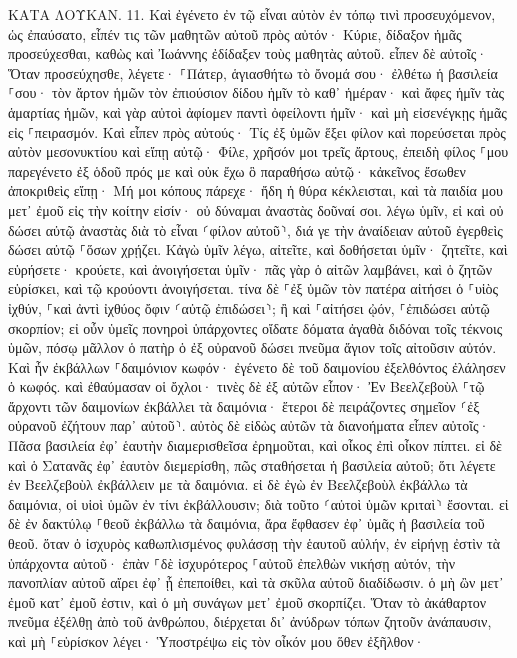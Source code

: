 \documentclass[twoside, 9pt]{extreport}
\begin{document}
ΚΑΤΑ ΛΟΥΚΑΝ.
11.
Καὶ ἐγένετο ἐν τῷ εἶναι αὐτὸν ἐν τόπῳ τινὶ προσευχόμενον, ὡς ἐπαύσατο, εἶπέν τις τῶν μαθητῶν αὐτοῦ πρὸς αὐτόν· Κύριε, δίδαξον ἡμᾶς προσεύχεσθαι, καθὼς καὶ Ἰωάννης ἐδίδαξεν τοὺς μαθητὰς αὐτοῦ. 
εἶπεν δὲ αὐτοῖς· Ὅταν προσεύχησθε, λέγετε· ⸀Πάτερ, ἁγιασθήτω τὸ ὄνομά σου· ἐλθέτω ἡ βασιλεία ⸀σου· 
τὸν ἄρτον ἡμῶν τὸν ἐπιούσιον δίδου ἡμῖν τὸ καθ᾽ ἡμέραν· 
καὶ ἄφες ἡμῖν τὰς ἁμαρτίας ἡμῶν, καὶ γὰρ αὐτοὶ ἀφίομεν παντὶ ὀφείλοντι ἡμῖν· καὶ μὴ εἰσενέγκῃς ἡμᾶς εἰς ⸀πειρασμόν. 
Καὶ εἶπεν πρὸς αὐτούς· Τίς ἐξ ὑμῶν ἕξει φίλον καὶ πορεύσεται πρὸς αὐτὸν μεσονυκτίου καὶ εἴπῃ αὐτῷ· Φίλε, χρῆσόν μοι τρεῖς ἄρτους, 
ἐπειδὴ φίλος ⸀μου παρεγένετο ἐξ ὁδοῦ πρός με καὶ οὐκ ἔχω ὃ παραθήσω αὐτῷ· 
κἀκεῖνος ἔσωθεν ἀποκριθεὶς εἴπῃ· Μή μοι κόπους πάρεχε· ἤδη ἡ θύρα κέκλεισται, καὶ τὰ παιδία μου μετ᾽ ἐμοῦ εἰς τὴν κοίτην εἰσίν· οὐ δύναμαι ἀναστὰς δοῦναί σοι. 
λέγω ὑμῖν, εἰ καὶ οὐ δώσει αὐτῷ ἀναστὰς διὰ τὸ εἶναι ⸂φίλον αὐτοῦ⸃, διά γε τὴν ἀναίδειαν αὐτοῦ ἐγερθεὶς δώσει αὐτῷ ⸀ὅσων χρῄζει. 
Κἀγὼ ὑμῖν λέγω, αἰτεῖτε, καὶ δοθήσεται ὑμῖν· ζητεῖτε, καὶ εὑρήσετε· κρούετε, καὶ ἀνοιγήσεται ὑμῖν· 
πᾶς γὰρ ὁ αἰτῶν λαμβάνει, καὶ ὁ ζητῶν εὑρίσκει, καὶ τῷ κρούοντι ἀνοιγήσεται. 
τίνα δὲ ⸀ἐξ ὑμῶν τὸν πατέρα αἰτήσει ὁ ⸀υἱὸς ἰχθύν, ⸀καὶ ἀντὶ ἰχθύος ὄφιν ⸂αὐτῷ ἐπιδώσει⸃; 
ἢ καὶ ⸀αἰτήσει ᾠόν, ⸀ἐπιδώσει αὐτῷ σκορπίον; 
εἰ οὖν ὑμεῖς πονηροὶ ὑπάρχοντες οἴδατε δόματα ἀγαθὰ διδόναι τοῖς τέκνοις ὑμῶν, πόσῳ μᾶλλον ὁ πατὴρ ὁ ἐξ οὐρανοῦ δώσει πνεῦμα ἅγιον τοῖς αἰτοῦσιν αὐτόν. 
Καὶ ἦν ἐκβάλλων ⸀δαιμόνιον κωφόν· ἐγένετο δὲ τοῦ δαιμονίου ἐξελθόντος ἐλάλησεν ὁ κωφός. καὶ ἐθαύμασαν οἱ ὄχλοι· 
τινὲς δὲ ἐξ αὐτῶν εἶπον· Ἐν Βεελζεβοὺλ ⸀τῷ ἄρχοντι τῶν δαιμονίων ἐκβάλλει τὰ δαιμόνια· 
ἕτεροι δὲ πειράζοντες σημεῖον ⸂ἐξ οὐρανοῦ ἐζήτουν παρ᾽ αὐτοῦ⸃. 
αὐτὸς δὲ εἰδὼς αὐτῶν τὰ διανοήματα εἶπεν αὐτοῖς· Πᾶσα βασιλεία ἐφ᾽ ἑαυτὴν διαμερισθεῖσα ἐρημοῦται, καὶ οἶκος ἐπὶ οἶκον πίπτει. 
εἰ δὲ καὶ ὁ Σατανᾶς ἐφ᾽ ἑαυτὸν διεμερίσθη, πῶς σταθήσεται ἡ βασιλεία αὐτοῦ; ὅτι λέγετε ἐν Βεελζεβοὺλ ἐκβάλλειν με τὰ δαιμόνια. 
εἰ δὲ ἐγὼ ἐν Βεελζεβοὺλ ἐκβάλλω τὰ δαιμόνια, οἱ υἱοὶ ὑμῶν ἐν τίνι ἐκβάλλουσιν; διὰ τοῦτο ⸂αὐτοὶ ὑμῶν κριταὶ⸃ ἔσονται. 
εἰ δὲ ἐν δακτύλῳ ⸀θεοῦ ἐκβάλλω τὰ δαιμόνια, ἄρα ἔφθασεν ἐφ᾽ ὑμᾶς ἡ βασιλεία τοῦ θεοῦ. 
ὅταν ὁ ἰσχυρὸς καθωπλισμένος φυλάσσῃ τὴν ἑαυτοῦ αὐλήν, ἐν εἰρήνῃ ἐστὶν τὰ ὑπάρχοντα αὐτοῦ· 
ἐπὰν ⸀δὲ ἰσχυρότερος ⸀αὐτοῦ ἐπελθὼν νικήσῃ αὐτόν, τὴν πανοπλίαν αὐτοῦ αἴρει ἐφ᾽ ᾗ ἐπεποίθει, καὶ τὰ σκῦλα αὐτοῦ διαδίδωσιν. 
ὁ μὴ ὢν μετ᾽ ἐμοῦ κατ᾽ ἐμοῦ ἐστιν, καὶ ὁ μὴ συνάγων μετ᾽ ἐμοῦ σκορπίζει. 
Ὅταν τὸ ἀκάθαρτον πνεῦμα ἐξέλθῃ ἀπὸ τοῦ ἀνθρώπου, διέρχεται δι᾽ ἀνύδρων τόπων ζητοῦν ἀνάπαυσιν, καὶ μὴ ⸀εὑρίσκον λέγει· Ὑποστρέψω εἰς τὸν οἶκόν μου ὅθεν ἐξῆλθον· 
\end{document}
